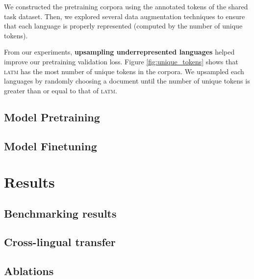\documentclass[11pt]{article}
\begin{document}
We constructed the pretraining corpora using the annotated tokens of the shared task dataset.
Then, we explored several data augmentation techniques to ensure that each language is properly represented (computed by the number of unique tokens).

From our experiments, \textbf{upsampling underrepresented languages} helped improve our pretraining validation loss.
Figure \ref{fig:unique_tokens} shows that \textsc{latm} has the most number of unique tokens in the corpora.
We upsampled each languages by randomly choosing a document until the number of unique tokens is greater than or equal to that of \textsc{latm}.



\subsection{Model Pretraining}


\subsection{Model Finetuning}


\section{Results}


\subsection{Benchmarking results}


\subsection{Cross-lingual transfer}


\subsection{Ablations}





\end{document}
